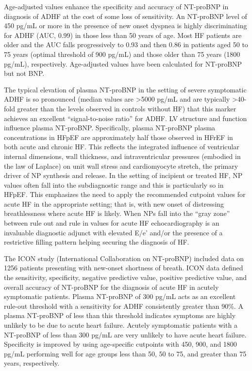 \documentclass[14pt,a4paper,onecolumn]{extarticle}
\begin{document}
Age-adjusted values enhance the specificity and accuracy of NT-proBNP in diagnosis of ADHF at the cost of some loss of sensitivity. An NT-proBNP level of 450 pg/mL or more in the presence of new onset dyspnea is highly discriminating for ADHF (AUC, 0.99) in those less than 50 years of age. Most HF patients are older and the AUC falls progressively to 0.93 and then 0.86 in patients aged 50 to 75 years (optimal threshold of 900 pg/mL) and those older than 75 years (1800 pg/mL), respectively. Age-adjusted values have been calculated for NT-proBNP but not BNP. \citep{Januzzi2006a} %

The typical elevation of plasma NT-proBNP in the setting of severe symptomatic ADHF is so pronounced (median values are >5000 pg/mL and are typically >40-fold greater than the levels observed in controls without HF) that this marker achieves an excellent “signal-to-noise ratio” for ADHF. LV structure and function influence plasma NT-proBNP. Specifically, plasma NT-proBNP plasma concentrations in HFpEF are approximately half those observed in HFrEF in both acute and chronic HF. This reflects the integrated influence of ventricular internal dimensions, wall thickness, and intraventricular pressures (embodied in the law of Laplace) on unit wall stress and cardiomyocyte stretch, the primary driver of NP synthesis and release. In the setting of incipient or treated HF, NP values often fall into the subdiagnostic range and this is particularly so in HFpEF. This emphasizes the need to apply the recommended cutpoint values for acute HF in the appropriate setting; that is, with new onset of distressing breathlessness where acute HF is likely. When NPs fall into the “gray zone” between rule out and rule in values for acute HF echocardiography is an invaluable diagnostic adjunct with elevated E/e’ and/or the presence of a restrictive filling pattern helping securing the diagnosis of HF. \citep{Richards2018} %

The ICON study (International Collaboration on NT-proBNP) included data on 1256 patients presenting with new-onset shortness of breath. ICON data defined the sensitivity, specificity, negative predictive value, positive predictive value, and overall accuracy of NT-proBNP for the diagnosis of acute HF in acutely symptomatic patients.  Plasma NT-proBNP of 300 pg/mL acts as an excellent rule-out threshold with a sensitivity for ADHF consistently greater than 90\%. A plasma NT-proBNP of less than this threshold indicates symptoms are highly unlikely to be due to acute heart failure. Acutely symptomatic patients with a NT-proBNP of less than 300 pg/mL are very unlikely to have acute heart failure. Specificity is improved by using age-specific cutpoints with 450, 900, and 1800 pg/mL performing well for age groups less than 50, 50 to 75, and greater than 75 years, respectively. \citep{Januzzi2006a} %
\end{document}
